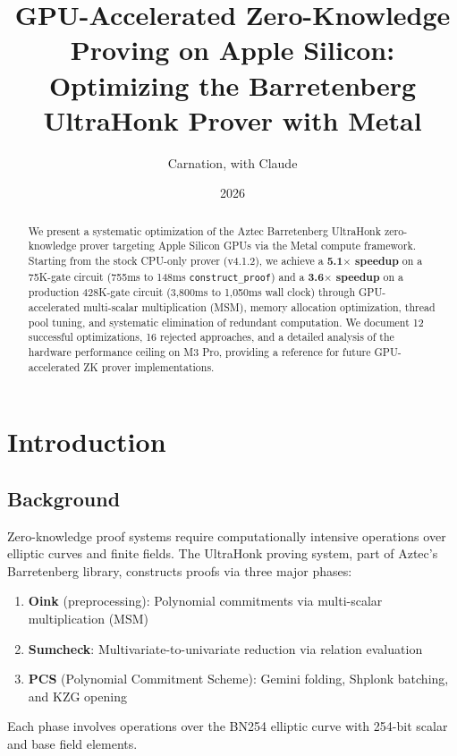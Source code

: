 \documentclass[11pt,a4paper]{article}
\title{GPU-Accelerated Zero-Knowledge Proving on Apple Silicon:\\Optimizing the Barretenberg UltraHonk Prover with Metal}
\author{Carnation, with Claude}
\date{2026}
\begin{document}
\maketitle

\begin{abstract}
We present a systematic optimization of the Aztec Barretenberg UltraHonk zero-knowledge prover targeting Apple Silicon GPUs via the Metal compute framework. Starting from the stock CPU-only prover (v4.1.2), we achieve a \textbf{5.1$\times$ speedup} on a 75K-gate circuit (755ms to 148ms \texttt{construct\_proof}) and a \textbf{3.6$\times$ speedup} on a production 428K-gate circuit (3,800ms to 1,050ms wall clock) through GPU-accelerated multi-scalar multiplication (MSM), memory allocation optimization, thread pool tuning, and systematic elimination of redundant computation. We document 12 successful optimizations, 16 rejected approaches, and a detailed analysis of the hardware performance ceiling on M3 Pro, providing a reference for future GPU-accelerated ZK prover implementations.
\end{abstract}

\tableofcontents
\newpage

\section{Introduction}

\subsection{Background}

Zero-knowledge proof systems require computationally intensive operations over elliptic curves and finite fields. The UltraHonk proving system, part of Aztec's Barretenberg library, constructs proofs via three major phases:

\begin{enumerate}
    \item \textbf{Oink} (preprocessing): Polynomial commitments via multi-scalar multiplication (MSM)
    \item \textbf{Sumcheck}: Multivariate-to-univariate reduction via relation evaluation
    \item \textbf{PCS} (Polynomial Commitment Scheme): Gemini folding, Shplonk batching, and KZG opening
\end{enumerate}

Each phase involves operations over the BN254 elliptic curve with 254-bit scalar and base field elements.
\end{document}
